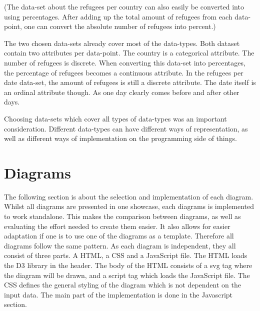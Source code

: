 (The data-set about the refugees per country can also easily be converted into using percentages. After adding up the total amount of refugees from each data-point, one can convert the absolute number of refugees into percent.)


The two chosen data-sets already cover most of the data-types. Both dataset contain two attributes per data-point. The country is a categorical attribute. The number of refugees is discrete. When converting this data-set into percentages, the percentage of refugees becomes a continuous attribute. In the refugees per date data-set, the amount of refugees is still a discrete attribute. The date itself is an ordinal attribute though. As one day clearly comes before and after other days.

Choosing data-sets which cover all types of data-types was an important consideration. Different data-types can have different ways of representation, as well as different ways of implementation on the programming side of things.


\section{Diagrams}

The following section is about the selection and implementation of each diagram. Whilst all diagrams are presented in one showcase, each diagrams is implemented to work standalone. This makes the comparison between diagrams, as well as evaluating the effort needed to create them easier. It also allows for easier adaptation if one is to use one of the diagrams as a template. Therefore all diagrams follow the same pattern. As each diagram is independent, they all consist of three parts. A HTML, a CSS and a JavaScript file. The HTML loads the D3 library in the header. The body of the HTML consists of a svg tag where the diagram will be drawn, and a script tag which loads the JavaScript file. The CSS defines the general styling of the diagram which is not dependent on the input data. The main part of the implementation is done in the Javascript section.

